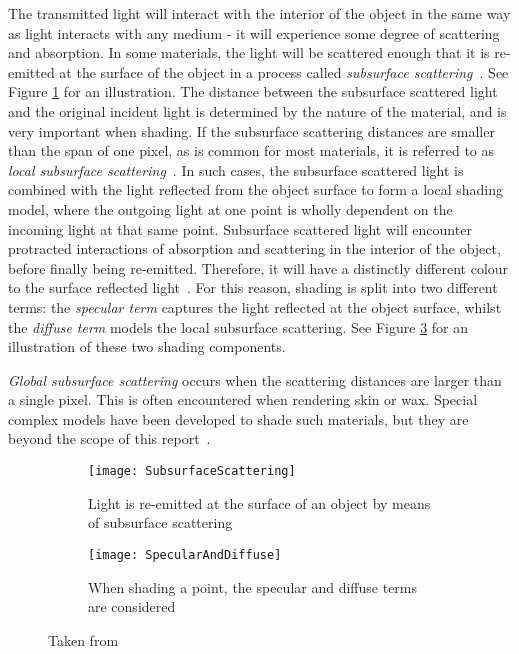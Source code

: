 The transmitted light will interact with the interior of the object in the same way as light interacts with any medium - it will experience some degree of scattering and absorption. In some materials, the light will be scattered enough that it is re-emitted at the surface of the object in a process called \textit{subsurface scattering}~\cite{Spectroscopy}. See Figure \ref{fig:SubsurfaceScattering} for an illustration. The distance between the subsurface scattered light and the original incident light is determined by the nature of the material, and is very important when shading. If the subsurface scattering distances are smaller than the span of one pixel, as is common for most materials, it is referred to as \textit{local subsurface scattering}~\cite{PractitionersReflectionModels}. In such cases, the subsurface scattered light is combined with the light reflected from the object surface to form a local shading model, where the outgoing light at one point is wholly dependent on the incoming light at that same point. Subsurface scattered light will encounter protracted interactions of absorption and scattering in the interior of the object, before finally being re-emitted. Therefore, it will have a distinctly different colour to the surface reflected light~\cite{ReflectionFromLayeredSurfaces}. For this reason, shading is split into two different terms: the \textit{specular term} captures the light reflected at the object surface, whilst the \textit{diffuse term} models the local subsurface scattering. See Figure \ref{fig:SpecularAndDiffuse} for an illustration of these two shading components.

\textit{Global subsurface scattering} occurs when the scattering distances are larger than a single pixel. This is often encountered when rendering skin or wax. Special complex models have been developed to shade such materials, but they are beyond the scope of this report~\cite{SeparableSubsurfaceScattering}.

\begin{figure}[h]
	\begin{subfigure}{0.48\textwidth}
		\centering
		\texttt{[image: SubsurfaceScattering]}
		\caption{Light is re-emitted at the surface of an object by means of subsurface scattering}
		\label{fig:SubsurfaceScattering}
	\end{subfigure}
	\hspace*{\fill}
	\begin{subfigure}{0.48\textwidth}
		\centering
		\texttt{[image: SpecularAndDiffuse]}
		\caption{When shading a point, the specular and diffuse terms are considered}
		\label{fig:SpecularAndDiffuse}
	\end{subfigure}
	\caption{Taken from~\cite{RTR4}}
\end{figure}

